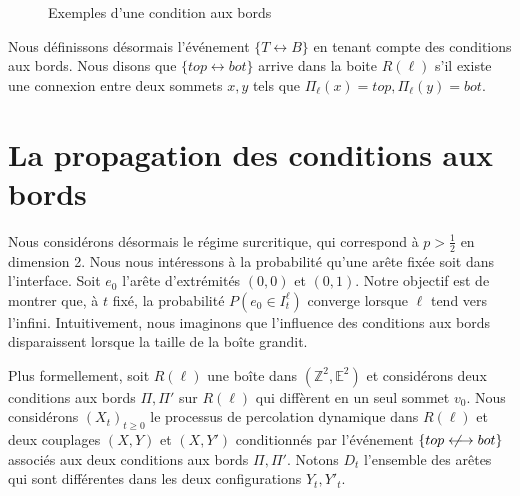 \documentclass[titlepage,a4paper,12pt]{article}
\newcounter{prop}
\newcounter{cor}
\newcommand{\nlongleftrightarrow}{\longleftrightarrow \kern-15pt\not \kern15pt}
\begin{document}
\begin{figure}[h]
\center
{}
\caption{Exemples d'une condition aux bords}
\end{figure}

Nous définissons désormais l'événement $\{T\longleftrightarrow B\}$ en tenant compte des conditions aux bords. Nous disons que $\{top\longleftrightarrow bot\}$ arrive dans la boite $R(\ell)$ s'il existe une connexion entre deux sommets $x,y$ tels que $\Pi_{\ell}(x) = top, \Pi_{\ell}(y) = bot$.
\section{La propagation des conditions aux bords}
Nous considérons désormais le régime surcritique, qui correspond à $p>\frac{1}{2}$ en dimension 2. Nous nous intéressons à la probabilité qu'une arête fixée soit dans l'interface. Soit $e_0$ l'arête d'extrémités $(0,0)$ et $(0,1)$. Notre objectif est de montrer que, à $t$ fixé, la probabilité $P(e_0 \in I^\ell_t)$ converge lorsque $\ell$ tend vers l'infini. Intuitivement, nous imaginons que l'influence des conditions aux bords disparaissent lorsque la taille de la boîte grandit. %

Plus formellement, soit $R(\ell)$ une boîte dans $(\mathbb{Z}^2,\mathbb{E}^2)$ et considérons deux conditions aux bords $\Pi, \Pi'$ sur $R(\ell)$ qui diffèrent en un seul sommet $v_0$. Nous considérons $(X_t)_{t\geqslant 0}$ le processus de percolation dynamique dans $R(\ell)$ et deux couplages $(X,Y)$ et $(X,Y')$ conditionnés par l'événement $\{top\nlongleftrightarrow bot\}$ associés aux deux conditions aux bords $\Pi, \Pi'$. Notons $D_t$ l'ensemble des arêtes qui sont différentes dans les deux configurations $Y_t,Y'_t$.
\end{document}
